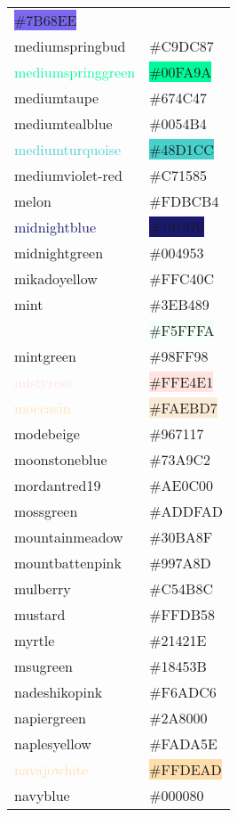 \documentclass[
]{article}
\begin{document}
\begin{longtable}[]{@{}ll@{}}
\colorbox{mediumslateblue}{\#7B68EE}\tabularnewline
\textcolor{mediumspringbud}{mediumspringbud} &
\colorbox{mediumspringbud}{\#C9DC87}\tabularnewline
\textcolor{mediumspringgreen}{mediumspringgreen} &
\colorbox{mediumspringgreen}{\#00FA9A}\tabularnewline
\textcolor{mediumtaupe}{mediumtaupe} &
\colorbox{mediumtaupe}{\#674C47}\tabularnewline
\textcolor{mediumtealblue}{mediumtealblue} &
\colorbox{mediumtealblue}{\#0054B4}\tabularnewline
\textcolor{mediumturquoise}{mediumturquoise} &
\colorbox{mediumturquoise}{\#48D1CC}\tabularnewline
\textcolor{mediumviolet-red}{mediumviolet-red} &
\colorbox{mediumviolet-red}{\#C71585}\tabularnewline
\textcolor{melon}{melon} & \colorbox{melon}{\#FDBCB4}\tabularnewline
\textcolor{midnightblue}{midnightblue} &
\colorbox{midnightblue}{\#191970}\tabularnewline
\textcolor{midnightgreen}{midnightgreen} &
\colorbox{midnightgreen}{\#004953}\tabularnewline
\textcolor{mikadoyellow}{mikadoyellow} &
\colorbox{mikadoyellow}{\#FFC40C}\tabularnewline
\textcolor{mint}{mint} & \colorbox{mint}{\#3EB489}\tabularnewline
\textcolor{mintcream}{mintcream} &
\colorbox{mintcream}{\#F5FFFA}\tabularnewline
\textcolor{mintgreen}{mintgreen} &
\colorbox{mintgreen}{\#98FF98}\tabularnewline
\textcolor{mistyrose}{mistyrose} &
\colorbox{mistyrose}{\#FFE4E1}\tabularnewline
\textcolor{moccasin}{moccasin} &
\colorbox{antiquewhite}{\#FAEBD7}\tabularnewline
\textcolor{modebeige}{modebeige} &
\colorbox{drab}{\#967117}\tabularnewline
\textcolor{moonstoneblue}{moonstoneblue} &
\colorbox{moonstoneblue}{\#73A9C2}\tabularnewline
\textcolor{mordantred19}{mordantred19} &
\colorbox{mordantred19}{\#AE0C00}\tabularnewline
\textcolor{mossgreen}{mossgreen} &
\colorbox{mossgreen}{\#ADDFAD}\tabularnewline
\textcolor{mountainmeadow}{mountainmeadow} &
\colorbox{mountainmeadow}{\#30BA8F}\tabularnewline
\textcolor{mountbattenpink}{mountbattenpink} &
\colorbox{mountbattenpink}{\#997A8D}\tabularnewline
\textcolor{mulberry}{mulberry} &
\colorbox{mulberry}{\#C54B8C}\tabularnewline
\textcolor{mustard}{mustard} &
\colorbox{mustard}{\#FFDB58}\tabularnewline
\textcolor{myrtle}{myrtle} & \colorbox{myrtle}{\#21421E}\tabularnewline
\textcolor{msugreen}{msugreen} &
\colorbox{msugreen}{\#18453B}\tabularnewline
\textcolor{nadeshikopink}{nadeshikopink} &
\colorbox{nadeshikopink}{\#F6ADC6}\tabularnewline
\textcolor{napiergreen}{napiergreen} &
\colorbox{napiergreen}{\#2A8000}\tabularnewline
\textcolor{naplesyellow}{naplesyellow} &
\colorbox{jonquil}{\#FADA5E}\tabularnewline
\textcolor{navajowhite}{navajowhite} &
\colorbox{navajowhite}{\#FFDEAD}\tabularnewline
\textcolor{navyblue}{navyblue} &
\colorbox{navyblue}{\#000080}\tabularnewline

\end{longtable}
\end{document}
